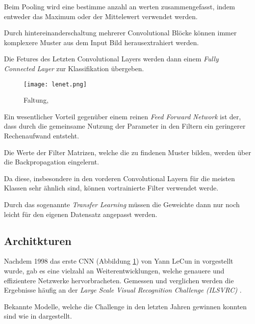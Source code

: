 Beim Pooling wird eine bestimme anzahl an werten 
zusammengefasst, indem entweder das Maximum oder der 
Mittelewert verwendet werden.

Durch hintereinanderschaltung mehrerer Convolutional Blöcke
können immer komplexere Muster aus dem 
Input Bild herausextrahiert werden.

Die Fetures des Letzten Convolutional Layers werden dann einem 
\textit{Fully Connected Layer}  zur Klassifikation 
übergeben.



\vspace{1cm}
\begin{figure}[H]
    \centering
    \label{fig:lenet}
    \texttt{[image: lenet.png]}
    \caption{Faltung, \cite{lecunGradientBasedLearningApplied1998}}
\end{figure}
\vspace{1cm}


Ein wesentlicher Vorteil gegenüber einem reinen 
\textit{Feed Forward Network}
ist der, dass durch die gemeinsame Nutzung
der Parameter in den Filtern ein 
geringerer Rechenaufwand entsteht.

Die Werte der Filter Matrizen, welche die zu 
findenen Muster bilden, 
werden über die Backpropagation eingelernt.

Da diese, insbesondere in den vorderen Convolutional 
Layern für die meisten Klassen sehr ähnlich sind,
können vortrainierte Filter verwendet werde.

Durch das sogenannte \textit{Transfer Learning}
müssen die Geweichte dann nur noch leicht 
für den eigenen Datensatz angepasst werden.




\subsection{Architkturen}\label{subsubsec:architectures}


Nachdem 1998 das erste CNN (Abbildung \ref{fig:lenet})
 von Yann LeCun in 
\cite{lecunGradientBasedLearningApplied1998} 
vorgestellt wurde, gab es eine vielzahl 
an Weiterentwicklungen, welche genauere und 
effizientere Netzwerke hervorbracheten.
Gemessen und verglichen werden die Ergebnisse häufig an 
der \textit{Large Scale Visual Recognition Challenge (ILSVRC)}
 \cite{ImageNetLargeScale}.


Bekannte Modelle, welche die Challenge in den letzten 
Jahren gewinnen konnten sind wie in \cite{stanfordConvNetList}
dargestellt.


